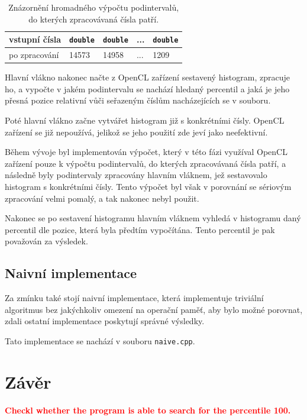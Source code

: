 \documentclass[12pt, a4paper]{article}
\let\oldsection\section
\renewcommand\section{\clearpage\oldsection}
\begin{document}
\begin{table}[!ht]
    \begin{center}
        \begin{tabular}{ | m{6.5em} | m{1.5cm}| m{1.5cm} | m{1.5cm} | m{1.5cm} | } 
             \hline
             vstupní čísla & \texttt{double} & \texttt{double} & ... & \texttt{double} \\ 

             \hline
              po zpracování &  14573 & 14958 & ... & 1209 \\  

             \hline
        \end{tabular}
    \end{center}
    \caption{\label{tab:opencl-bucket-computation}Znázornění hromadného výpočtu podintervalů, do kterých zpracovávaná čísla patří.}
\end{table}

Hlavní vlákno nakonec načte z OpenCL zařízení sestavený histogram, zpracuje ho, a vypočte v jakém podintervalu se nachází hledaný percentil a jaká je jeho přesná pozice relativní vůči seřazeným číslům nacházejících se v souboru.

Poté hlavní vlákno začne vytvářet histogram již s konkrétními čísly. OpenCL zařízení se již nepoužívá, jelikož se jeho použití zde jeví jako neefektivní.

Během vývoje byl implementován výpočet, který v této fázi využíval OpenCL zařízení pouze k výpočtu podintervalů, do kterých zpracovávaná čísla patří, a následně byly podintervaly zpracovány hlavním vláknem, jež sestavovalo histogram s konkrétními čísly.
Tento výpočet byl však v porovnání se sériovým zpracování velmi pomalý, a tak nakonec nebyl použit.

Nakonec se po sestavení histogramu hlavním vláknem vyhledá v histogramu daný percentil dle pozice, která byla předtím vypočítána.
Tento percentil je pak považován za výsledek.

\subsection{Naivní implementace}
Za zmínku také stojí naivní implementace, která implementuje triviální algoritmus bez jakýchkoliv omezení na operační paměť, aby bylo možné porovnat, zdali ostatní implementace poskytují správné výsledky.

Tato implementace se nachází v souboru \texttt{naive.cpp}.

\section{Závěr}

\textcolor{red}{\textbf{Checkl whether the program is able to search for the percentile 100.}} 
\end{document}
